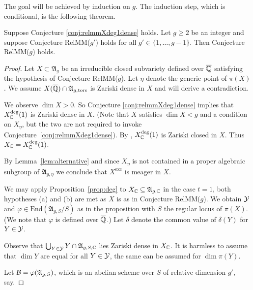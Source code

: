 \documentclass[12pt,oneside]{amsart}
\begin{document}
The goal will be achieved by induction on $g$. The induction step,
which is conditional, is the
following theorem.

\begin{theorem}
  \label{thm:relmminduction}
  Suppose Conjecture \ref{conj:relmmXdeg1dense} holds. Let $g\ge 2$ be
  an integer and suppose Conjecture \textrm{RelMM}($g'$) holds for all
  $g'\in \{1,\ldots,g-1\}$. Then Conjecture {{RelMM($g$)}} holds.
\end{theorem}
\begin{proof}
  Let $X\subset\mathfrak{A}_g$ be an irreducible closed subvariety
  defined over ${\overline{\mathbb{Q}}}$
  satisfying the hypothesis of Conjecture RelMM($g$). Let $\eta$
  denote the generic point of $\pi(X)$. 
  We assume  $X({\overline{\mathbb{Q}}})\cap\mathfrak{A}_{g,\mathrm{tors}}$ is Zariski
  dense in $X$ and  will derive a contradiction.

  We observe  $\dim X >0$. So 
  Conjecture \ref{conj:relmmXdeg1dense} implies that
  $X_{\mathbb{C}}^{\mathrm{deg}}(1)$ is Zariski dense in $X$. (Note that $X$
  satisfies $\dim X < g$ and a condition on $X_\eta$, but the two are not
  required to invoke
   Conjecture~\ref{conj:relmmXdeg1dense}).
  By \cite[Theorem~7.1]{GaoBettiRank},
  $X_{\mathbb{C}}^{\mathrm{deg}}(1)$ is Zariski closed in $X$. Thus
  $X_{\mathbb{C}} = X_{\mathbb{C}}^{\mathrm{deg}}(1)$.

  By Lemma~\ref{lem:alternative} and since $X_\eta$ is not contained
  in a proper algebraic subgroup of $\mathfrak{A}_{g,\eta}$ we conclude
  that $X^{\mathrm{exc}}$ is meager in $X$.


  We may apply Proposition~\ref{prop:deg} to
  $X_{\mathbb{C}}\subseteq\mathfrak{A}_{g,{\mathbb{C}}}$ in the case $t=1$, both hypotheses
  (a) and (b) are met as $X$ is as in Conjecture RelMM($g$). We obtain
  ${\mathcal Y}$ and $\varphi \in \mathrm{End}(\mathfrak{A}_{g,S}/S)$ as in the
  proposition with $S$ the regular locus of $\pi(X)$. (We note that
  $\varphi$ is defined over ${\overline{\mathbb{Q}}}$.) Let $\delta$
  denote the common value of $\delta(Y)$ for $Y\in{\mathcal Y}$.

  Observe that  $\bigcup_{Y\in{\mathcal Y}}Y\cap\mathfrak{A}_{g,S,{\mathbb{C}}}$
  lies Zariski dense in $X_{\mathbb{C}}$.
  It is harmless to assume that $\dim Y$ are equal for
  all $Y\in{\mathcal Y}$, the same can be assumed for $\dim\pi(Y)$.  
  
  Let $\mathcal{B} = \varphi(\mathfrak{A}_{g,S})$, which is an abelian scheme
  over $S$ of relative dimension $g'$, say.


\end{proof}
\end{document}
